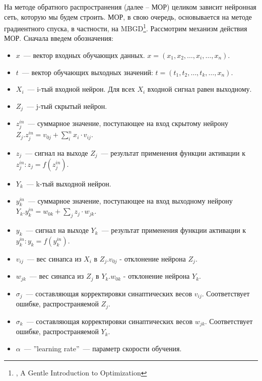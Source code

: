 \documentclass[12pt, a4paper]{article}
\begin{document}
На методе обратного распространения (далее – МОР) целиком зависит нейронная сеть, которую мы будем строить. МОР, в свою очередь, основывается на методе градиентного спуска, в частности, на MBGD\footnote{\cite{Intro_optimization}, A Gentle Introduction to Optimization}. Рассмотрим механизм действия МОР. Сначала введем обозначения: \\
\begin{itemize}
	\item $x$~--- вектор входных обучающих данных. $x = (x_1, x_2, \ldots, x_i, \ldots,  x_n)$.
	\item $t$~--- вектор обучающих выходных значений: $t = (t_1, t_2, \ldots, t_k, \ldots, x_n)$.
	\item $X_i$~--- i-тый входной нейрон. Для всех $X_i$ входной сигнал равен выходному.
	\item $Z_j$~--- j-тый скрытый нейрон.
	\item $z_j^{in}$~--- суммарное значение, поступающее на вход скрытому нейрону $Z_j. z_j^{in} = v_{0j} + \sum_i^n x_i \cdot v_{ij}$.
	\item $z_j$~--- сигнал на выходе $Z_j$~--- результат применения функции активации к $z_j^{in}: z_j = f(z_j^{in})$.
	\item $Y_k$~--- k-тый выходной нейрон.
	\item $y_k^{in}$~--- суммарное значение, поступающее на вход выходному нейрону $Y_k. y_k^{in} = w_{0k} + \sum_j z_j \cdot w_{jk}$.
	\item $y_k$~--- сигнал на выходе $Y_k$~--- результат применения функции активации к $y_k^{in}: y_k = f(y_k^{in})$.
	\item $v_{ij}$~--- вес синапса из $X_i$ в $Z_j. v_{0j}$ - отклонение нейрона $Z_j$.
	\item $w_{jk}$~--- вес синапса из $Z_j$ в $Y_k. w_{0k}$ - отклонение нейрона $Y_k$.
	\item $\sigma_j$~--- составляющая корректировки синаптических весов $v_{ij}$. Соответствует ошибке, распространяемой $Z_j$.
	\item $\sigma_k$~--- составляющая корректировки синаптических весов $w_{jk}$. Соответствует ошибке, распространяемой $Y_k$.
	\item $\alpha$~--- ''learning rate''~--- параметр скорости обучения.
\end{itemize}
\end{document}
